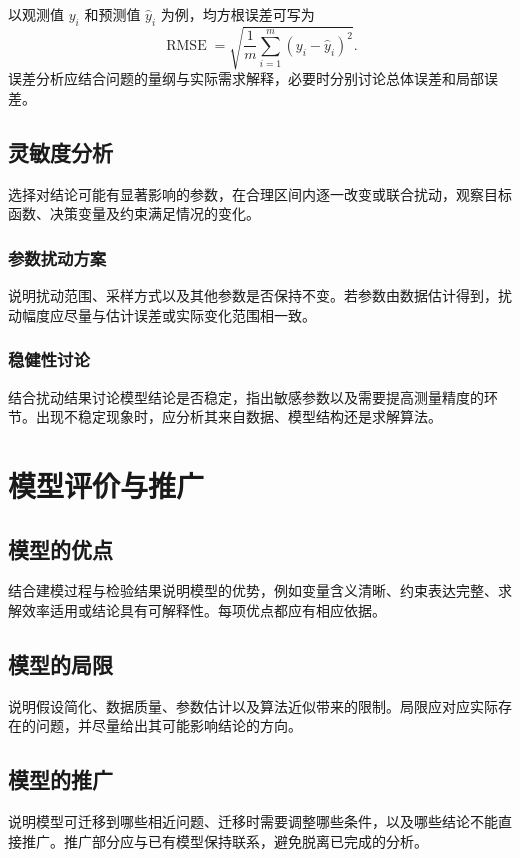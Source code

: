 \documentclass{gmcmthesis}
\begin{document}
以观测值 $y_i$ 和预测值 $\hat y_i$ 为例，均方根误差可写为
\begin{equation}
  \operatorname{RMSE}
  =\sqrt{\frac{1}{m}\sum_{i=1}^{m}(y_i-\hat y_i)^2}.
\end{equation}
误差分析应结合问题的量纲与实际需求解释，必要时分别讨论总体误差和局部误差。

\subsection{灵敏度分析}
选择对结论可能有显著影响的参数，在合理区间内逐一改变或联合扰动，观察目标函数、决策变量及约束满足情况的变化。

\subsubsection{参数扰动方案}
说明扰动范围、采样方式以及其他参数是否保持不变。若参数由数据估计得到，扰动幅度应尽量与估计误差或实际变化范围相一致。

\subsubsection{稳健性讨论}
结合扰动结果讨论模型结论是否稳定，指出敏感参数以及需要提高测量精度的环节。出现不稳定现象时，应分析其来自数据、模型结构还是求解算法。

\section{模型评价与推广}

\subsection{模型的优点}
结合建模过程与检验结果说明模型的优势，例如变量含义清晰、约束表达完整、求解效率适用或结论具有可解释性。每项优点都应有相应依据。

\subsection{模型的局限}
说明假设简化、数据质量、参数估计以及算法近似带来的限制。局限应对应实际存在的问题，并尽量给出其可能影响结论的方向。

\subsection{模型的推广}
说明模型可迁移到哪些相近问题、迁移时需要调整哪些条件，以及哪些结论不能直接推广。推广部分应与已有模型保持联系，避免脱离已完成的分析。
\end{document}
